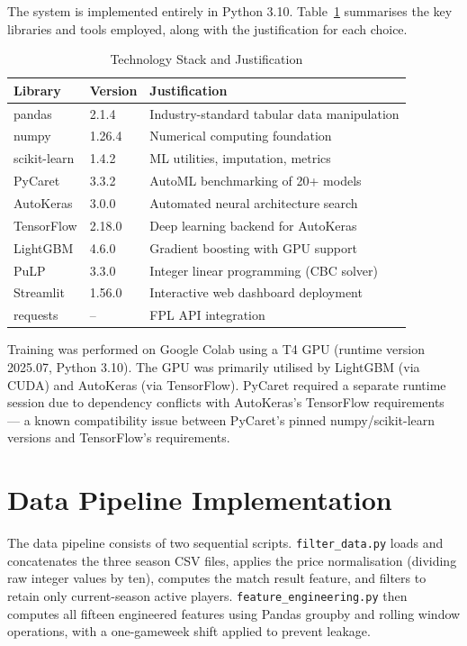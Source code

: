 \documentclass[11pt,english,listoffigures,listoftables]{tfgetsinf}
\begin{document}
The system is implemented entirely in Python 3.10. Table~\ref{tab:tools} summarises the key libraries and tools employed, along with the justification for each choice.

\begin{table}[h]
\centering
\caption{Technology Stack and Justification}
\label{tab:tools}
\begin{tabular}{lll}
\toprule
\textbf{Library} & \textbf{Version} & \textbf{Justification} \\
\midrule
pandas & 2.1.4 & Industry-standard tabular data manipulation \\
numpy & 1.26.4 & Numerical computing foundation \\
scikit-learn & 1.4.2 & ML utilities, imputation, metrics \\
PyCaret & 3.3.2 & AutoML benchmarking of 20+ models \\
AutoKeras & 3.0.0 & Automated neural architecture search \\
TensorFlow & 2.18.0 & Deep learning backend for AutoKeras \\
LightGBM & 4.6.0 & Gradient boosting with GPU support \\
PuLP & 3.3.0 & Integer linear programming (CBC solver) \\
Streamlit & 1.56.0 & Interactive web dashboard deployment \\
requests & -- & FPL API integration \\
\bottomrule
\end{tabular}
\end{table}

Training was performed on Google Colab using a T4 GPU (runtime version 2025.07, Python 3.10). The GPU was primarily utilised by LightGBM (via CUDA) and AutoKeras (via TensorFlow). PyCaret required a separate runtime session due to dependency conflicts with AutoKeras's TensorFlow requirements --- a known compatibility issue between PyCaret's pinned numpy/scikit-learn versions and TensorFlow's requirements.

\section{Data Pipeline Implementation}

The data pipeline consists of two sequential scripts. \texttt{filter\_data.py} loads and concatenates the three season CSV files, applies the price normalisation (dividing raw integer values by ten), computes the match result feature, and filters to retain only current-season active players. \texttt{feature\_engineering.py} then computes all fifteen engineered features using Pandas groupby and rolling window operations, with a one-gameweek shift applied to prevent leakage.
\end{document}
